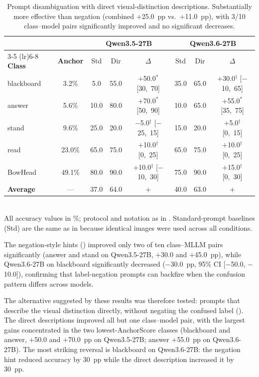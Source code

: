\documentclass[a4paper,fleqn]{cas-sc}
\begin{document}
\begin{table}[t]
\caption{Prompt disambiguation with direct visual-distinction descriptions. Substantially more effective than negation (combined $+$25.0~pp vs.\ $+$11.0~pp), with 3/10 class--model pairs significantly improved and no significant decreases.}
\label{tab:prompt_opt_direct}
\centering
\footnotesize
\setlength{\tabcolsep}{3pt}
\begin{tabular}{lccccccc}
\toprule
& & \multicolumn{3}{c}{\textbf{Qwen3.5-27B}} & \multicolumn{3}{c}{\textbf{Qwen3.6-27B}} \\
\cmidrule(lr){3-5} \cmidrule(lr){6-8}
\textbf{Class} & \textbf{Anchor} & Std & Dir & $\Delta$ & Std & Dir & $\Delta$ \\
\midrule
blackboard & 3.2\% & 5.0 & 55.0 & $+$50.0$^*$ [30,~70] & 35.0 & 65.0 & $+$30.0$^\dagger$ [$-$10,~65] \\
answer & 5.6\% & 10.0 & 80.0 & $+$70.0$^*$ [50,~90] & 10.0 & 65.0 & $+$55.0$^*$ [35,~75] \\
stand & 9.6\% & 25.0 & 20.0 & $-$5.0$^\dagger$ [$-$25,~15] & 15.0 & 20.0 & $+$5.0$^\dagger$ [0,~15] \\
read & 23.0\% & 65.0 & 75.0 & $+$10.0$^\dagger$ [0,~25] & 65.0 & 75.0 & $+$10.0$^\dagger$ [0,~25] \\
BowHead & 49.1\% & 80.0 & 90.0 & $+$10.0$^\dagger$ [$-$10,~30] & 75.0 & 90.0 & $+$15.0$^\dagger$ [0,~30] \\
\textbf{Average} & --- & 37.0 & 64.0 & \textbf{\boldmath$+$\unboldmath27.0} & 40.0 & 63.0 & \textbf{\boldmath$+$\unboldmath23.0} \\
\bottomrule
\end{tabular}
\\[2pt]
\footnotesize{All accuracy values in \%; protocol and notation as in . Standard-prompt baselines (Std) are the same as in  because identical images were used across all conditions.}
\end{table}

The negation-style hints () improved only two of ten class--MLLM pairs significantly (answer and stand on Qwen3.5-27B, $+$30.0 and $+$45.0~pp), while Qwen3.6-27B on blackboard significantly decreased ($-$30.0~pp, 95\% CI [$-$50.0, $-$10.0]), confirming that label-negation prompts can backfire when the confusion pattern differs across models.

The alternative suggested by these results was therefore tested: prompts that describe the visual distinction directly, without negating the confused label (). The direct descriptions improved all but one class--model pair, with the largest gains concentrated in the two lowest-AnchorScore classes (blackboard and answer, $+$50.0 and $+$70.0~pp on Qwen3.5-27B; answer $+$55.0~pp on Qwen3.6-27B). The most striking reversal is blackboard on Qwen3.6-27B: the negation hint reduced accuracy by 30~pp while the direct description increased it by 30~pp.
\end{document}
